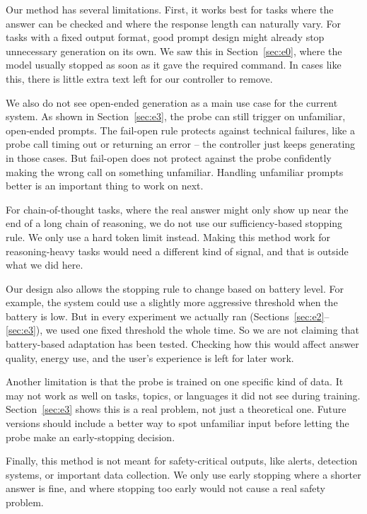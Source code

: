 \documentclass[review,12pt]{elsarticle}
\begin{document}
Our method has several limitations. First, it works best for tasks where the answer can be checked and
where the response length can naturally vary. For tasks with a fixed
output format, good prompt design might already stop unnecessary
generation on its own. We saw this in Section~\ref{sec:e0}, where the
model usually stopped as soon as it gave the required command. In
cases like this, there is little extra text left for our controller to
remove.

We also do not see open-ended generation as a main use case for the
current system. As shown in Section~\ref{sec:e3}, the probe can still
trigger on unfamiliar, open-ended prompts. The fail-open rule protects
against technical failures, like a probe call timing out or returning
an error -- the controller just keeps generating in those cases. But
fail-open does not protect against the probe confidently making the
wrong call on something unfamiliar. Handling unfamiliar prompts better
is an important thing to work on next.

For chain-of-thought tasks, where the real answer might only show up
near the end of a long chain of reasoning, we do not use our
sufficiency-based stopping rule. We only use a hard token limit
instead. Making this method work for reasoning-heavy tasks would need
a different kind of signal, and that is outside what we did here.

Our design also allows the stopping rule to change based on battery
level. For example, the system could use a slightly more aggressive
threshold when the battery is low. But in every experiment we actually
ran (Sections~\ref{sec:e2}--\ref{sec:e3}), we used one fixed threshold
the whole time. So we are not claiming that battery-based adaptation
has been tested. Checking how this would affect answer quality, energy
use, and the user's experience is left for later work.

Another limitation is that the probe is trained on one specific kind of
data. It may not work as well on tasks, topics, or languages it did not
see during training. Section~\ref{sec:e3} shows this is a real problem,
not just a theoretical one. Future versions should include a better way
to spot unfamiliar input before letting the probe make an early-stopping
decision.

Finally, this method is not meant for safety-critical outputs, like
alerts, detection systems, or important data collection. We only use
early stopping where a shorter answer is fine, and where stopping too
early would not cause a real safety problem. 
\end{document}
